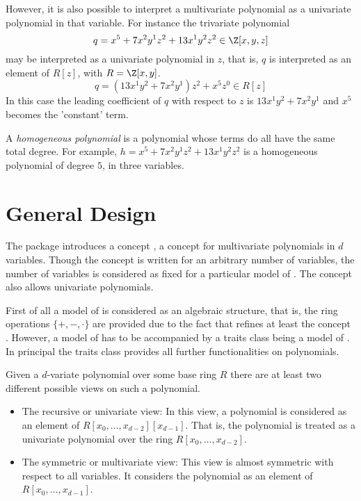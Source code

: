 However, it is also possible to interpret a multivariate polynomial as a 
univariate polynomial in that variable. For instance the trivariate polynomial 
\[q = x^5 + 7x^2y^1z^2 + 13x^1y^2z^2 \in \Z[x,y,z] \]
may be interpreted as a univariate polynomial in $z$, that is, $q$ is interpreted as an element of $R[z]$, with $R=\Z[x,y]$.  
\[q = (13x^1y^2 + 7x^2y^1)z^2 + x^5z^0 \in R[z] \]
In this case the leading coefficient of $q$ with respect to $z$ is
$13x^1y^2 + 7x^2y^1$ and $x^5$ becomes the 'constant' term. 

A {\em homogeneous polynomial} is a polynomial whose terms do all 
have the same total degree. 
For example, $h = x^5 + 7x^2y^1z^2 + 13x^1y^2z^2$ is a homogeneous polynomial 
of degree $5$, in three variables. 



\section{General Design}

The package introduces a concept , a concept for multivariate 
polynomials in $d$ variables. Though the concept is written for an arbitrary 
number of variables, the number of variables is considered as fixed for a 
particular model of . 
The concept also allows univariate polynomials.

First of all a model of  is considered as an algebraic 
structure, that is, the ring operations $\{+, -, \cdot\}$ are 
provided due to the fact that  refines at least the 
concept . 
However, a model of  has to be accompanied by a traits class 
 being a model of 
. 
In principal the traits class provides all further functionalities 
on polynomials.

Given a $d$-variate polynomial over some base ring $R$ there are at least 
two different possible views on such a polynomial.
\begin{itemize}
\item The recursive or univariate view:  
In this view, a polynomial is considered as 
an element of $R[x_0,\dots,x_{d-2}][x_{d-1}]$. That is, the polynomial 
is treated as a univariate polynomial over the ring $R[x_0,\dots,x_{d-2}]$. 
\item The symmetric or multivariate view: 
This view is almost symmetric with respect to all variables. It considers 
the polynomial as an element of $R [x_0,\dots,x_{d-1}]$.
\end{itemize}

